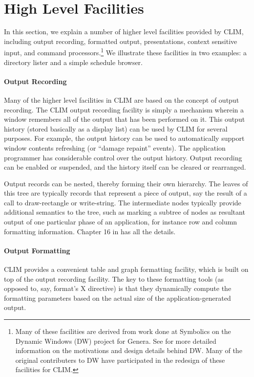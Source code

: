 \documentclass[twocolumn,a4paper]{article}
\newcommand {\code}[1]{{\sffamily #1}}
\newcommand {\CLIM}{{\small CLIM}}
\let\method\code
\begin{document}
\section{High Level Facilities}
In this section, we explain a number of higher level facilities provided by \CLIM{}, including output recording, formatted output, presentations, context sensitive input, and command processors.\footnote{Many of these facilities are derived from work done at Symbolics on the Dynamic Windows (DW) project for Genera\cite{prog-ref-manual}. See \cite{presentation-manager} for more detailed information on the motivations and design details behind DW. Many of the original contributers to DW have participated in the redesign of these facilities for \CLIM{}.} We illustrate these facilities in two examples: a directory lister and a simple schedule browser.

\paragraph*{Output Recording} 
Many of the higher level facilities in \CLIM{} are based on the concept of output recording. The \CLIM{} output recording facility is simply a mechanism wherein a window remembers all of the output that has been performed on it. This output history (stored basically as a display list) can be used by \CLIM{} for several purposes. For example, the output history can be used to automatically support window contents refreshing (or ``damage repaint'' events).  The application programmer has considerable control over the output history. Output recording can be enabled or suspended, and the history itself can be cleared or rearranged.

Output records can be nested, thereby forming their own hierarchy. The leaves of this tree are typically records that represent a piece of output, say the result of a call to \method{draw-rectangle} or \method{write-string}. The intermediate nodes typically provide additional semantics to the tree, such as marking a subtree of nodes as resultant output of one particular phase of an application, for instance row and column formatting information. Chapter 16 in \cite{clim-spec} has all the details.

\paragraph*{Output Formatting}
\CLIM{} provides a convenient table and graph formatting facility, which is built on top of the output recording facility. The key to these formatting tools (as opposed to, say, \code{format}'s X directive) is that they dynamically compute the formatting parameters based on the actual size of the application-generated output.
\end{document}
